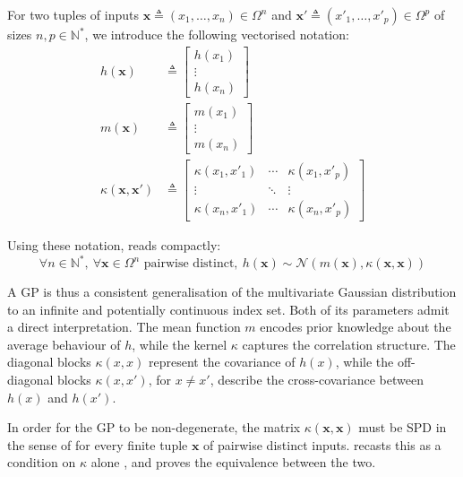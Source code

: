 For two tuples of inputs $\mathbf{x}\triangleq(x_1,\dots,x_n)\in\Omega^n$ and $\mathbf{x}'\triangleq(x'_1,\dots,x'_p)\in\Omega^p$ of sizes $n,p\in\mathbb{N}^*$, we introduce the following vectorised notation:
\begin{align}
	h(\mathbf{x})&\triangleq\begin{bmatrix}
	h(x_1)\\\vdots\\h(x_n)
	\end{bmatrix}\\
	m(\mathbf{x})&\triangleq\begin{bmatrix}
	m(x_1)\\\vdots\\m(x_n)
	\end{bmatrix}\\
	\kappa(\mathbf{x},\mathbf{x}')&\triangleq\begin{bmatrix}
	\kappa(x_1,x'_1)&\cdots&\kappa(x_1,x'_p)\\\vdots&\ddots&\vdots\\\kappa(x_n,x'_1)&\cdots&\kappa(x_n,x'_p)
	\end{bmatrix}
\end{align}

Using these notation,  reads compactly:
\begin{equation}
	\forall n\in\mathbb{N}^*,\:\forall\mathbf{x}\in\Omega^n\text{ pairwise distinct},\:h(\mathbf{x})\sim\mathcal{N}\left(m(\mathbf{x}),\kappa(\mathbf{x},\mathbf{x})\right)
\end{equation}

A GP is thus a consistent generalisation of the multivariate Gaussian distribution to an infinite and potentially continuous index set. Both of its parameters admit a direct interpretation. The mean function $m$ encodes prior knowledge about the average behaviour of $h$, while the kernel $\kappa$ captures the correlation structure. The diagonal blocks $\kappa(x,x)$ represent the covariance of $h(x)$, while the off-diagonal blocks $\kappa(x,x')$, for $x\neq x'$, describe the cross-covariance between $h(x)$ and $h(x')$.

In order for the GP to be non-degenerate, the matrix $\kappa(\mathbf{x},\mathbf{x})$ must be SPD in the sense of  for every finite tuple $\mathbf{x}$ of pairwise distinct inputs.  recasts this as a condition on $\kappa$ alone \cite{bib:Schoenberg}, and  proves the equivalence between the two.

